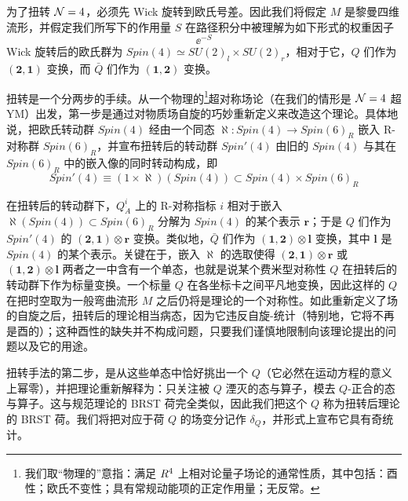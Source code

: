为了扭转 $\mathcal{N}=4$，必须先 Wick 旋转到欧氏号差。因此我们将假定 $M$ 是黎曼四维流形，并假定我们所写下的作用量 $S$ 在路径积分中被理解为如下形式的权重因子
\[ \ee^{-S} \]
Wick 旋转后的欧氏群为 $Spin(4)\simeq SU(2)_l\times SU(2)_r$，相对于它，$Q$ 们作为 $(\mathbf{2},\mathbf{1})$ 变换，而 $\bar Q$ 们作为 $(\mathbf{1},\mathbf{2})$ 变换。

扭转是一个分两步的手续。从一个物理的\footnote{我们取“物理的”意指：满足 $R^4$ 上相对论量子场论的通常性质，其中包括：酉性；欧氏不变性；具有常规动能项的正定作用量；无反常。}超对称场论（在我们的情形是 $\mathcal{N}=4$ 超 YM）出发，第一步是通过对物质场自旋的巧妙重新定义来改造这个理论。具体地说，把欧氏转动群 $Spin(4)$ 经由一个同态 $\aleph:Spin(4)\to Spin(6)_R$ 嵌入 R-对称群 $Spin(6)_R$，并宣布扭转后的转动群 $Spin'(4)$ 由旧的 $Spin(4)$ 与其在 $Spin(6)_R$ 中的嵌入像的同时转动构成，即
\[ Spin'(4) \equiv (1\times\aleph)(Spin(4)) \subset Spin(4)\times Spin(6)_R \]

在扭转后的转动群下，$Q^i_{\dot A}$ 上的 R-对称指标 $i$ 相对于嵌入 $\aleph(Spin(4))\subset Spin(6)_R$ 分解为 $Spin(4)$ 的某个表示 $\mathbf{r}$；于是 $Q$ 们作为 $Spin'(4)$ 的 $(\mathbf{2},\mathbf{1})\otimes\mathbf{r}$ 变换。类似地，$\bar Q$ 们作为 $(\mathbf{1},\mathbf{2})\otimes\mathbf{l}$ 变换，其中 $\mathbf{l}$ 是 $Spin(4)$ 的某个表示。关键在于，嵌入 $\aleph$ 的选取使得 $(\mathbf{2},\mathbf{1})\otimes\mathbf{r}$ 或 $(\mathbf{1},\mathbf{2})\otimes\mathbf{l}$ 两者之一中含有一个单态，也就是说某个费米型对称性 $Q$ 在扭转后的转动群下作为标量变换。一个标量 $Q$ 在各坐标卡之间平凡地变换，因此这样的 $Q$ 在把时空取为一般弯曲流形 $M$ 之后仍将是理论的一个对称性。如此重新定义了场的自旋之后，扭转后的理论相当病态，因为它违反自旋-统计（特别地，它将不再是酉的）；这种酉性的缺失并不构成问题，只要我们谨慎地限制向该理论提出的问题以及它的用途。


扭转手法的第二步，是从这些单态中恰好挑出一个 $Q$（它必然在运动方程的意义上幂零），并把理论重新解释为：只关注被 $Q$ 湮灭的态与算子，模去 $Q$-正合的态与算子。这与规范理论的 BRST 荷完全类似，因此我们把这个 $Q$ 称为扭转后理论的 BRST 荷。我们将把对应于荷 $Q$ 的场变分记作 $\delta_Q$，并形式上宣布它具有奇统计。

